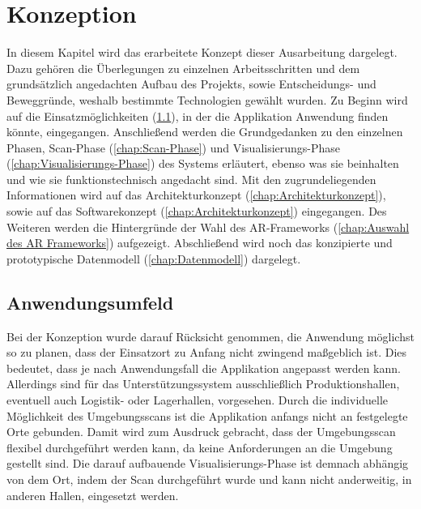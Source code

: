 \chapter{Konzeption}
\label{chap:Konzeption}
In diesem Kapitel wird das erarbeitete Konzept dieser Ausarbeitung dargelegt. Dazu gehören die Überlegungen zu einzelnen 
Arbeitsschritten und dem grundsätzlich angedachten Aufbau des Projekts, sowie Entscheidungs- und Beweggründe, weshalb bestimmte 
Technologien gewählt wurden. Zu Beginn wird auf die Einsatzmöglichkeiten (\ref{chap:Arbeitsumgebung}), in der die Applikation Anwendung 
finden könnte, eingegangen. Anschließend werden die Grundgedanken zu den einzelnen Phasen, Scan-Phase (\ref{chap:Scan-Phase}) und 
Visualisierungs-Phase (\ref{chap:Visualisierungs-Phase}) des Systems erläutert, ebenso was sie beinhalten und wie sie funktionstechnisch 
angedacht sind. Mit den zugrundeliegenden Informationen wird auf das Architekturkonzept (\ref{chap:Architekturkonzept}), sowie auf das 
Softwarekonzept (\ref{chap:Architekturkonzept}) eingegangen. Des Weiteren werden die Hintergründe der Wahl des AR-Frameworks 
(\ref{chap:Auswahl des AR Frameworks}) aufgezeigt. Abschließend wird noch das konzipierte und prototypische Datenmodell 
(\ref{chap:Datenmodell}) dargelegt.

\section{Anwendungsumfeld}
\label{chap:Arbeitsumgebung}
Bei der Konzeption wurde darauf Rücksicht genommen, die Anwendung möglichst so zu planen, dass der Einsatzort zu Anfang nicht zwingend 
maßgeblich ist. Dies bedeutet, dass je nach Anwendungsfall die Applikation angepasst werden kann. Allerdings sind für das 
Unterstützungssystem ausschließlich Produktionshallen, eventuell auch Logistik- oder Lagerhallen, vorgesehen. Durch die individuelle 
Möglichkeit des Umgebungsscans ist die Applikation anfangs nicht an festgelegte Orte gebunden. Damit wird zum Ausdruck gebracht, dass der 
Umgebungsscan flexibel durchgeführt werden kann, da keine Anforderungen an die Umgebung gestellt sind. Die darauf aufbauende 
Visualisierungs-Phase ist demnach abhängig von dem Ort, indem der Scan durchgeführt wurde und kann nicht anderweitig, in anderen Hallen, 
eingesetzt werden. 
\pagebreak
